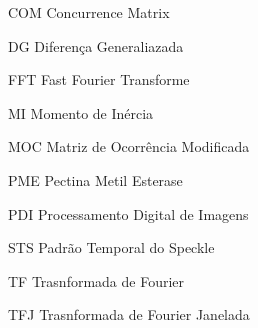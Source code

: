 
\begin{siglas}
  	\item[COM]{Concurrence Matrix}
  	\item[DG]{Diferença Generaliazada}
  	\item[FFT]{Fast Fourier Transforme}
	\item[MI]{Momento de Inércia}
	\item[MOC]{Matriz de Ocorrência Modificada}
	\item[PME]{Pectina Metil Esterase}
	\item[PDI]{Processamento Digital de Imagens}
	\item[STS]{Padrão Temporal do Speckle}
	\item[TF]{Trasnformada de Fourier}
	\item[TFJ]{Trasnformada de Fourier Janelada}
\end{siglas}
